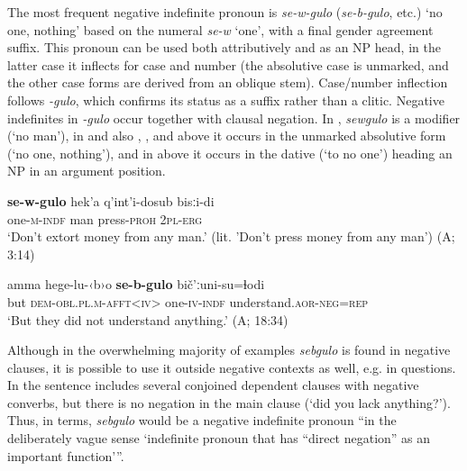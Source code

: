 \documentclass[output=paper,colorlinks=true, citecolor=brown]{langscibook}
\begin{document}
The most frequent negative indefinite pronoun is \textit{se-w-gulo} (\textit{se-b-gulo}, etc.) ‘no one, nothing’ based on the numeral \textit{se-w} ‘one’, with a final gender agreement suffix. This pronoun can be used both attributively and as an NP head, in the latter case it inflects for case and number (the absolutive case is unmarked, and the other case forms are derived from an oblique stem). Case/number inflection follows \textit{{}-gulo}, which confirms its status as a suffix rather than a clitic. Negative indefinites in \textit{{}-gulo} occur together with clausal negation. In , \textit{sewgulo} is a modifier (‘no man’), in  and also , ,  and  above it occurs in the unmarked absolutive form (‘no one, nothing’), and in  above it occurs in the dative (‘to no one’) heading an NP in an argument position. 

\ea
    \label{ex:and:50}
    \gll \textbf{se{}-w{}-gulo} hek’a q’int’i{}-dosub bisːi{}-di\\
          one-\textsc{m-indf} man press-\textsc{proh} \textsc{2pl{}-erg} \\
    \glt ‘Don’t extort money from any man.’ (lit. 'Don't press money from any man') (A;  3:14)
\z 

\ea
    \label{ex:and:51} 
    \gll amma hege{}-lu{}-‹b›o \textbf{se{}-b{}-gulo} bič’ːuni{}-su=ɬodi\\
          but \textsc{dem-obl.pl.m{}-afft<iv>} one-\textsc{iv-indf} understand.\textsc{aor-neg=rep} \\
    \glt ‘But they did not understand anything.’ (A;  18:34)
\z 

Although in the overwhelming majority of examples \textit{sebgulo} is found in negative clauses, it is possible to use it outside negative contexts as well, e.g. in questions. In  the sentence includes several conjoined dependent clauses with negative converbs, but there is no negation in the main clause (‘did you lack anything?’). Thus, in  terms, \textit{sebgulo} would be a negative indefinite pronoun “in the deliberately vague sense ‘indefinite pronoun that has “direct negation” as an important function’”.
\end{document}
